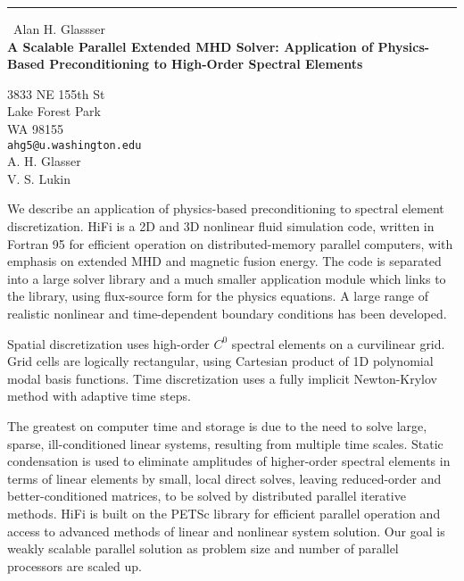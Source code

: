 \documentclass{report}
\begin{document}
\begin{center}
\rule{6in}{1pt} \
{\large Alan H. Glassser \\
{\bf A Scalable Parallel Extended MHD Solver: Application of Physics-Based Preconditioning to High-Order Spectral Elements}}

3833 NE 155th St \\ Lake Forest Park \\ WA 98155
\\
{\tt ahg5@u.washington.edu}\\
A. H. Glasser\\
V. S. Lukin\end{center}

\renewcommand*{\v}[1]{\hbox{\bfseries #1}}
\renewcommand*{\t}[1]{\hbox{\sffamily\bfseries #1}}

We describe an application of physics-based preconditioning \cite{Cha08}
to spectral element discretization. HiFi is a 2D and 3D nonlinear fluid
simulation code, written in Fortran 95 for efficient operation on
distributed-memory parallel computers, with emphasis on extended MHD and
magnetic fusion energy. The code is separated into a large solver
library and a much smaller application module which links to the
library, using flux-source form for the physics equations. A large
range of realistic nonlinear and time-dependent boundary conditions has
been developed.

Spatial discretization uses high-order $C^0$ spectral elements on a
curvilinear grid. Grid cells are logically rectangular, using Cartesian
product of 1D polynomial modal basis functions. Time discretization
uses a fully implicit Newton-Krylov method with adaptive time steps.

The greatest on computer time and storage is due to the need to solve
large, sparse, ill-conditioned linear systems, resulting from multiple
time scales. Static condensation is used to eliminate amplitudes of
higher-order spectral elements in terms of linear elements by small,
local direct solves, leaving reduced-order and better-conditioned
matrices, to be solved by distributed parallel iterative methods. HiFi
is built on the PETSc library \cite{petsc} for efficient parallel
operation and access to advanced methods of linear and nonlinear system
solution. Our goal is weakly scalable parallel solution as problem size
and number of parallel processors are scaled up.
\end{document}
